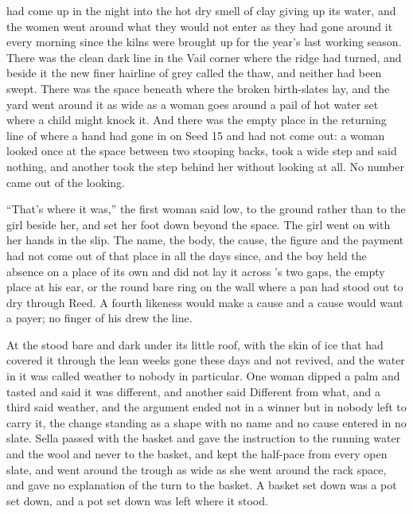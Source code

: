\scenebreak

 had come up in the night into the hot dry smell of clay giving up its water, and the women went around what they would not enter as they had gone around it every morning since the kilns were brought up for the year's last working season. There was the clean dark line in the Vail corner where the  ridge had turned, and beside it the new finer hairline of grey called the thaw, and neither had been swept. There was the space beneath  where the broken birth-slates lay, and the yard went around it as wide as a woman goes around a pail of hot water set where a child might knock it. And there was the empty place in the returning line of  where a hand had gone in on Seed 15 and had not come out: a woman looked once at the space between two stooping backs, took a wide step and said nothing, and another took the step behind her without looking at all. No number came out of the looking.

“That's where it was,” the first woman said low, to the ground rather than to the girl beside her, and set her foot down beyond the space. The girl went on with her hands in the slip. The name, the body, the cause, the figure and the payment had not come out of that place in all the days since, and the boy held the absence on a place of its own and did not lay it across 's two gaps, the empty place at his ear, or the round bare ring on the wall where a pan had stood out to dry through Reed. A fourth likeness would make a cause and a cause would want a payer; no finger of his drew the line.

At  the  stood bare and dark under its little roof, with the skin of ice that had covered it through the lean weeks gone these days and not revived, and the water in it was called weather to nobody in particular. One woman dipped a palm and tasted and said it was different, and another said Different from what, and a third said weather, and the argument ended not in a winner but in nobody left to carry it, the change standing as a shape with no name and no cause entered in no slate. Sella passed with the basket and gave the instruction to the running water and the wool and never to the basket, and kept the half-pace from every open slate, and went around the trough as wide as she went around the rack space, and gave no explanation of the turn to the basket. A basket set down was a pot set down, and a pot set down was left where it stood.

